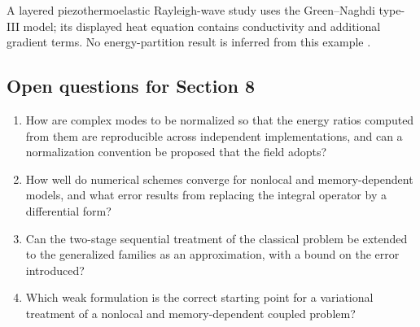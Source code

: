 A layered piezothermoelastic Rayleigh-wave study uses the Green–Naghdi type-III model; its displayed heat equation contains conductivity and additional gradient terms. No energy-partition result is inferred from this example \cite{Biswas2020}.

\subsection{Open questions for Section 8}

\begin{enumerate}[label=\textbf{OQ8.\arabic*}]
\item How are complex modes to be normalized so that the energy ratios computed from them are reproducible across independent implementations, and can a normalization convention be proposed that the field adopts? \label{oq:8.1}
\item How well do numerical schemes converge for nonlocal and memory-dependent models, and what error results from replacing the integral operator by a differential form? \label{oq:8.2}
\item Can the two-stage sequential treatment of the classical problem be extended to the generalized families as an approximation, with a bound on the error introduced? \label{oq:8.3}
\item Which weak formulation is the correct starting point for a variational treatment of a nonlocal and memory-dependent coupled problem? \label{oq:8.4}
\end{enumerate}


